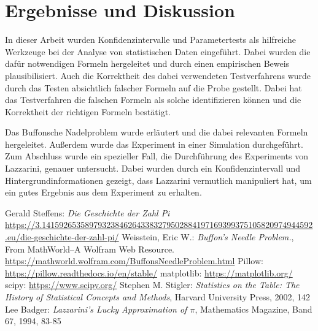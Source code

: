 \documentclass[10pt,twocolumn]{scrartcl}
\begin{document}
	
\section{Ergebnisse und Diskussion}
	In dieser Arbeit wurden Konfidenzintervalle und  Parametertests als hilfreiche Werkzeuge bei der Analyse von statistischen Daten eingeführt. Dabei wurden die dafür notwendigen Formeln hergeleitet und durch einen empirischen Beweis plausibilisiert.
	Auch die Korrektheit des dabei verwendeten Testverfahrens wurde durch das Testen absichtlich falscher Formeln auf die Probe gestellt. Dabei hat das Testverfahren die falschen Formeln als solche identifizieren können und die Korrektheit der richtigen Formeln bestätigt.
	
	Das Buffonsche Nadelproblem wurde erläutert und die dabei relevanten Formeln hergeleitet. Außerdem wurde das Experiment in einer Simulation durchgeführt.
	Zum Abschluss wurde ein spezieller Fall, die Durchführung des Experiments von Lazzarini, genauer untersucht. Dabei wurden durch ein Konfidenzintervall und Hintergrundinformationen gezeigt, dass Lazzarini vermutlich manipuliert hat, um ein gutes Ergebnis aus dem Experiment zu erhalten.
	

\newpage
\begin{thebibliography}{99}
	Gerald Steffens: \textit{Die Geschichte der Zahl Pi} \url{https://3.141592653589793238462643383279502884197169399375105820974944592.eu/die-geschichte-der-zahl-pi/}
	Weisstein, Eric W.: \textit{Buffon's Needle Problem.}, From MathWorld--A Wolfram Web Resource. \url{https://mathworld.wolfram.com/BuffonsNeedleProblem.html}
	Pillow: \url{https://pillow.readthedocs.io/en/stable/}
	matplotlib: \url{https://matplotlib.org/}
	scipy: \url{https://www.scipy.org/}
	Stephen M. Stigler: \textit{Statistics on the Table: The History of Statistical Concepts and Methods}, Harvard University Press, 2002, 142
	Lee Badger: \textit{Lazzarini’s Lucky Approximation of $\pi$}, Mathematics Magazine, Band 67, 1994, 83-85
\end{thebibliography}
\end{document}
